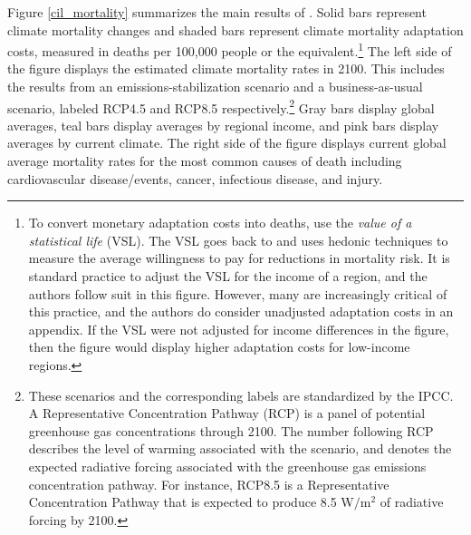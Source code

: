 Figure \ref{cil_mortality} summarizes the main results of \cite{carleton2022valuing}. Solid bars represent climate mortality changes and shaded bars represent climate mortality adaptation costs, measured in deaths per 100,000 people or the equivalent.\footnote{To convert monetary adaptation costs into deaths, \cite{carleton2022valuing} use the \emph{value of a statistical life} (VSL). The VSL goes back to \cite{thaler1976value} and uses hedonic techniques to measure the average willingness to pay for reductions in mortality risk. It is standard practice to adjust the VSL for the income of a region, and the authors follow suit in this figure. However, many are increasingly critical of this practice, and the authors do consider unadjusted adaptation costs in an appendix. If the VSL were not adjusted for income differences in the figure, then the figure would display higher adaptation costs for low-income regions.} The left side of the figure displays the estimated climate mortality rates in 2100. This includes the results from an emissions-stabilization scenario and a business-as-usual scenario, labeled RCP4.5 and RCP8.5 respectively.\footnote{These scenarios and the corresponding labels are standardized by the IPCC. A Representative Concentration Pathway (RCP) is a panel of potential greenhouse gas concentrations through 2100. The number following RCP describes the level of warming associated with the scenario, and denotes the expected radiative forcing associated with the greenhouse gas emissions concentration pathway. For instance, RCP8.5 is a Representative Concentration Pathway that is expected to produce 8.5 W$/$m$^2$ of radiative forcing by 2100.} Gray bars display global averages, teal bars display averages by regional income, and pink bars display averages by current climate. The right side of the figure displays current global average mortality rates for the most common causes of death including cardiovascular disease/events, cancer, infectious disease, and injury. 


